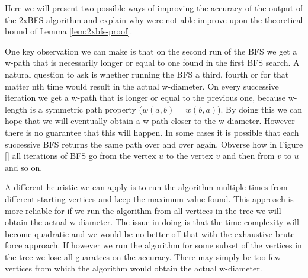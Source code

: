 Here we will present two possible ways of improving the accuracy of the output of the 2xBFS algorithm and explain why were not able improve upon the theoretical bound of Lemma \ref{lem:2xbfs-proof}.

One key observation we can make is that on the second run of the BFS we get a w-path that is necessarily longer or equal to one found in the first BFS search. A natural question to ask is whether running the BFS a third, fourth or for that matter nth time would result in the actual w-diameter. On every successive iteration we get a w-path that is longer or equal to the previous one, because w-length is a symmetric path property ($w(a, b) = w(b, a)$). By doing this we can hope that we will eventually obtain a w-path closer to the w-diameter. However there is no guarantee that this will happen. In some cases it is possible that each successive BFS returns the same path over and over again. Obverse how in Figure [] all iterations of BFS go from the vertex $u$ to the vertex $v$ and then from $v$ to $u$ and so on.

A different heuristic we can apply is to run the algorithm multiple times from different starting vertices and keep the maximum value found. This approach is more reliable for if we run the algorithm from all vertices in the tree we will obtain the actual w-diameter. The issue in doing is that the time complexity will become quadratic and we would be no better off that with the exhaustive brute force approach. If however we run the algorithm for some subset of the vertices in the tree we lose all guaratees on the accuracy. There may simply be too few vertices from which the algorithm would obtain the actual w-diameter.





